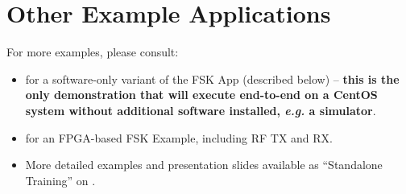
\section{Other Example Applications}
For more examples, please consult:
\begin{itemize}
  \item {} for a software-only variant of the FSK App (described below)
  -- \textbf{this is the only demonstration that will execute end-to-end on a CentOS system without additional software installed, \textit{e.g.} a simulator}.
  \item {} for an FPGA-based FSK Example, including RF TX and RX.
  \item More detailed examples and presentation slides available as ``Standalone Training'' on \href{http://opencpi.github.io/}{}.
\end{itemize}


